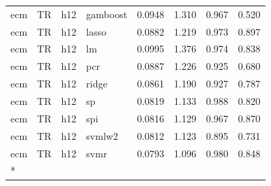\begin{ThreePartTable}
\begin{longtable}[t]{llclcccc}
ecm & TR & h12 & gamboost & 0.0948 & 1.310 & 0.967 & 0.520\\
ecm & TR & h12 & lasso & 0.0882 & 1.219 & 0.973 & 0.897\\
ecm & TR & h12 & lm & 0.0995 & 1.376 & 0.974 & 0.838\\
ecm & TR & h12 & pcr & 0.0887 & 1.226 & 0.925 & 0.680\\
ecm & TR & h12 & ridge & 0.0861 & 1.190 & 0.927 & 0.787\\
ecm & TR & h12 & sp & 0.0819 & 1.133 & 0.988 & 0.820\\
ecm & TR & h12 & spi & 0.0816 & 1.129 & 0.967 & 0.870\\
ecm & TR & h12 & svmlw2 & 0.0812 & 1.123 & 0.895 & 0.731\\
ecm & TR & h12 & svmr & 0.0793 & 1.096 & 0.980 & 0.848\\*
\end{longtable}
\end{ThreePartTable}
\endgroup{}
